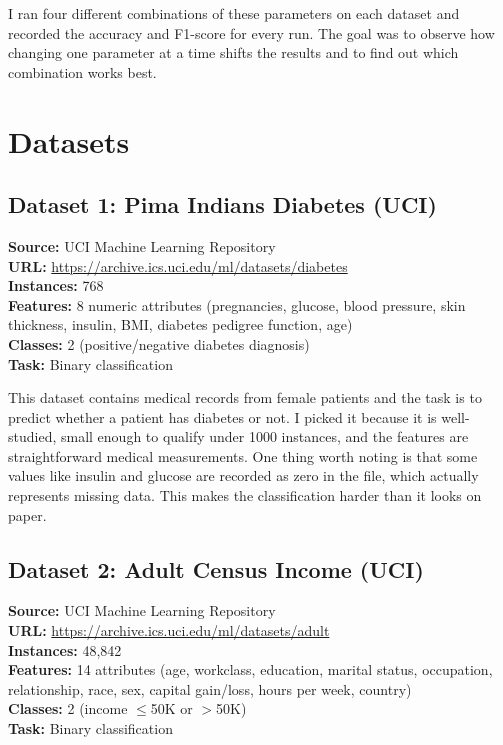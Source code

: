 \documentclass[12pt,a4paper]{article}
\begin{document}
I ran four different combinations of these parameters on each dataset and
recorded the accuracy and F1-score for every run. The goal was to observe
how changing one parameter at a time shifts the results and to find out which
combination works best.

\section{Datasets}

\subsection{Dataset 1: Pima Indians Diabetes (UCI)}

\textbf{Source:} UCI Machine Learning Repository\\
\textbf{URL:} \url{https://archive.ics.uci.edu/ml/datasets/diabetes}\\
\textbf{Instances:} 768\\
\textbf{Features:} 8 numeric attributes (pregnancies, glucose, blood pressure,
skin thickness, insulin, BMI, diabetes pedigree function, age)\\
\textbf{Classes:} 2 (positive/negative diabetes diagnosis)\\
\textbf{Task:} Binary classification

This dataset contains medical records from female patients and the task is to
predict whether a patient has diabetes or not. I picked it because it is
well-studied, small enough to qualify under 1000 instances, and the features
are straightforward medical measurements. One thing worth noting is that some
values like insulin and glucose are recorded as zero in the file, which
actually represents missing data. This makes the classification harder than
it looks on paper.

\subsection{Dataset 2: Adult Census Income (UCI)}

\textbf{Source:} UCI Machine Learning Repository\\
\textbf{URL:} \url{https://archive.ics.uci.edu/ml/datasets/adult}\\
\textbf{Instances:} 48,842\\
\textbf{Features:} 14 attributes (age, workclass, education, marital status,
occupation, relationship, race, sex, capital gain/loss, hours per week, country)\\
\textbf{Classes:} 2 (income $\leq$50K or $>$50K)\\
\textbf{Task:} Binary classification
\end{document}
